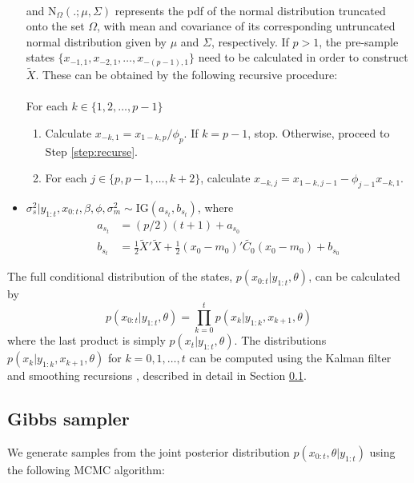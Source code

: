 \documentclass{article}
\begin{document}
\begin{itemize}
\begin{align*}
\end{align*}
\noindent and $\mbox{N}_{\Omega}(.;\mu,\Sigma)$ represents the pdf of the normal distribution truncated onto the set $\Omega$, with mean and covariance of its corresponding untruncated normal distribution given by $\mu$ and $\Sigma$, respectively. If $p > 1$, the pre-sample states $\{x_{-1,1}, x_{-2,1}, \ldots, x_{-(p-1),1}\}$ need to be calculated in order to construct $\tilde{X}$. These can be obtained by the following recursive procedure: \\
\\
For each $k \in \{1,2,\ldots,p-1\}$
\begin{enumerate}
\item Calculate $x_{-k,1} = x_{1-k,p} / \phi_p$. If $k = p - 1$, stop. Otherwise, proceed to Step \ref{step:recurse}.
\item For each $j \in \{p,p-1,\ldots,k+2\}$, calculate $x_{-k,j} = x_{1-k,j-1} - \phi_{j-1}x_{-k,1}$. \label{step:recurse}
\end{enumerate}
\item $\sigma^2_s|y_{1:t},x_{0:t},\beta,\phi,\sigma^2_m \sim \mbox{IG}(a_{s_t}, b_{s_t})$, where
\begin{align*}
a_{s_t} &= (p/2)(t+1) + a_{s_0} \\
b_{s_t} &= \frac{1}{2}\tilde{X}'\tilde{X} + \frac{1}{2}(x_0-m_0)'\tilde{C_0}(x_0-m_0) + b_{s_0}
\end{align*}
\end{itemize}

The full conditional distribution of the states, $p(x_{0:t}|y_{1:t},\theta)$, can be calculated by
\[p(x_{0:t}|y_{1:t},\theta) = \prod_{k=0}^t p(x_k|y_{1:k},x_{k+1},\theta)\]
where the last product is simply $p(x_t|y_{1:t},\theta)$. The distributions $p(x_k|y_{1:k},x_{k+1},\theta)$ for $k = 0,1,\ldots,t$ can be computed using the Kalman filter and smoothing recursions \citep{petris2009dynamic}, described in detail in Section \ref{sec:gibbs}.

\subsection{Gibbs sampler} \label{sec:gibbs}

We generate samples from the joint posterior distribution $p(x_{0:t},\theta|y_{1:t})$ using the following MCMC algorithm:
\end{document}
